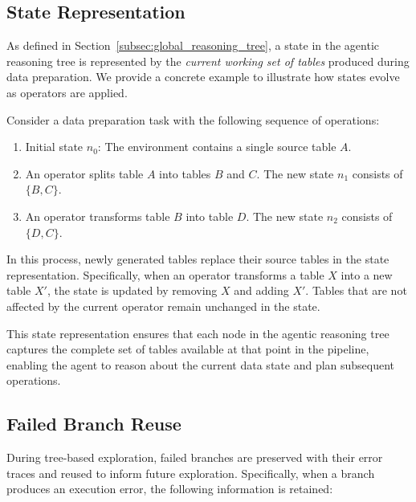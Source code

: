 \subsection{State Representation}
\label{subsec:appendix_state_representation}

As defined in Section~\ref{subsec:global_reasoning_tree}, a state in the agentic reasoning tree is represented by the \emph{current working set of tables} produced during data preparation. We provide a concrete example to illustrate how states evolve as operators are applied.

\begin{example}
\label{exam:state_representation}
Consider a data preparation task with the following sequence of operations:
\begin{enumerate}[leftmargin=*]
    \item {Initial state $n_0$:} The environment contains a single source table $A$.
    \item An operator splits table $A$ into tables $B$ and $C$. The new state $n_1$ consists of $\{B, C\}$.
    \item An operator transforms table $B$ into table $D$. The new state $n_2$ consists of $\{D, C\}$.
\end{enumerate}
In this process, newly generated tables replace their source tables in the state representation. Specifically, when an operator transforms a table $X$ into a new table $X'$, the state is updated by removing $X$ and adding $X'$. Tables that are not affected by the current operator remain unchanged in the state.
\end{example}

This state representation ensures that each node in the agentic reasoning tree captures the complete set of tables available at that point in the pipeline, enabling the agent to reason about the current data state and plan subsequent operations.






\subsection{Failed Branch Reuse}
\label{subsec:appendix_failed_branch}

During tree-based exploration, failed branches are preserved with their error traces and reused to inform future exploration. Specifically, when a branch produces an execution error, the following information is retained:

